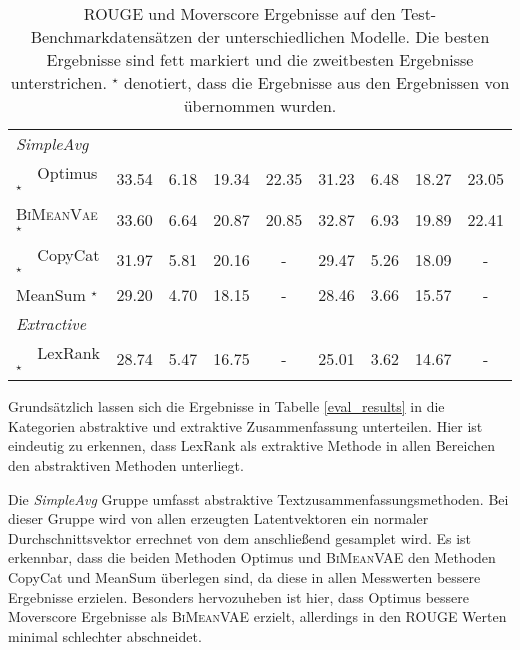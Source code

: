 \begin{table}[!h]
\begin{tabular}{@{}lcccccccc@{}}
    \textit{SimpleAvg}         &         &         &        &      &  &        &        \\
    $\quad$ Optimus  $^{\star}$          & 33.54   & 6.18    & 19.34 & 22.35& 31.23  & 6.48   & 18.27 & 23.05\\
    $\quad$ \textsc{BiMeanVae}$^{\star}$ & 33.60   & 6.64    & 20.87 & 20.85& 32.87  & 6.93   & 19.89 & 22.41\\
    $\quad$ CopyCat  $^{\star}$          & 31.97   & 5.81    & 20.16 &- & 29.47  & 5.26   & 18.09 & -\\ 
    $\quad$ MeanSum  $^{\star}$          & 29.20   & 4.70    & 18.15 & -& 28.46  & 3.66   & 15.57 & -\\ \midrule
    \textit{Extractive}        &         &         &        &      &  &        &  &      \\
    $\quad$ LexRank  $^{\star}$          & 28.74   & 5.47    & 16.75 & -& 25.01  & 3.62   & 14.67 & -\\ \bottomrule
    \end{tabular}
    \caption{ROUGE und Moverscore Ergebnisse auf den Test-Benchmarkdatensätzen der unterschiedlichen Modelle. Die besten Ergebnisse sind fett markiert und die zweitbesten Ergebnisse unterstrichen.
    $^{\star}$ denotiert, dass die Ergebnisse aus den Ergebnissen von \citep{coop} übernommen wurden.
    }
\end{table}

Grundsätzlich lassen sich die Ergebnisse in Tabelle \ref{eval_results} in die Kategorien abstraktive und extraktive Zusammenfassung unterteilen.
Hier ist eindeutig zu erkennen, dass LexRank als extraktive Methode in allen Bereichen den abstraktiven Methoden unterliegt.

Die \textit{SimpleAvg} Gruppe umfasst abstraktive Textzusammenfassungsmethoden. 
Bei dieser Gruppe wird von allen erzeugten Latentvektoren ein normaler Durchschnittsvektor errechnet von dem anschließend gesamplet wird.
Es ist erkennbar, dass die beiden Methoden Optimus und \textsc{BiMeanVAE} den Methoden CopyCat und MeanSum überlegen sind, da diese in allen Messwerten bessere Ergebnisse erzielen.
Besonders hervozuheben ist hier, dass Optimus bessere Moverscore Ergebnisse als \textsc{BiMeanVAE} erzielt, allerdings in den ROUGE Werten minimal schlechter abschneidet.

